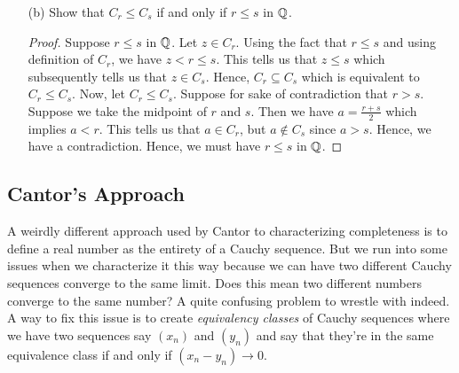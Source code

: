 \begin{enumerate}
\begin{proof}
   Now, we show the reverse inclusion. Suppose \( x \in C_{rs} \), then \( x < rs \) for \( r,s \geq 0  \) in \( \Q  \). Suppose \( r,s > 0  \) (if \( r,s = 0  \) then the result follows immediately), then dividing by \( r  \) on both sides gives us \( x /r  < s   \) which tells us that \( x / r \in C_{s}  \). Similarly, we can divide by \(  s  \) to get \( x / s < r  \) which implies \( x / s \in C_{r}  \). Hence, taking the product of these two elements leads to 
   \[  \frac{ x }{ s }  \cdot \frac{ x }{ r }  < (rs)^{2} \iff \frac{ x  }{ s^{2}  } \cdot \frac{ x  }{ r^{2} } < rs . \] Hence, we must have \( x \in C_{r}C_{s} \) and thus we have \(  C_{rs } \subseteq C_{r}C_{s} \). 
        \end{proof}
    \item[(b)] Show that \( C_{r} \leq C_{s}  \) if and only if \( r \leq s  \) in \( \Q  \).
        \begin{proof}
        Suppose \( r \leq s  \) in \( \Q  \). Let \( z \in C_{r}  \). Using the fact that \( r \leq s  \) and using definition of \( C_{r}  \), we have \( z < r \leq s   \). This tells us that \( z \leq s  \) which subsequently tells us that \( z \in C_{s}   \). Hence, \( C_{r } \subseteq C_{s}  \) which is equivalent to \( C_{r} \leq C_{s} \). Now, let \( C_{r} \leq C_{s}  \). Suppose for sake of contradiction that \( r > s  \). Suppose we take the midpoint of \( r  \) and \( s \). Then we have \( a = \frac{ r+s }{ 2 }  \) which implies \( a < r  \). This tells us that \( a \in C_{r} \), but \( a \notin C_{s} \) since \( a > s  \). Hence, we have a contradiction. Hence, we must have \( r \leq s  \) in \( \Q  \).      
        \end{proof}
\end{enumerate}

\subsection{Cantor's Approach}

A weirdly different approach used by Cantor to characterizing completeness is to define a real number as the entirety of a Cauchy sequence. But we run into some issues when we characterize it this way because we can have two different Cauchy sequences converge to the same limit. Does this mean two different numbers converge to the same number? A quite confusing problem to wrestle with indeed. A way to fix this issue is to create \textit{equivalency classes} of Cauchy sequences where we have two sequences say \( (x_{n}) \) and \( (y_{n}) \) and say that they're in the same equivalence class if and only if \( (x_{n} - y_{n}) \to 0  \).




